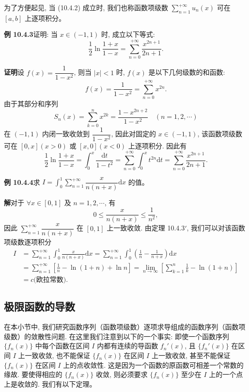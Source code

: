 \documentclass[UTF8,12pt,a4paper,fontset=fandol]{ctexart}
\begin{document}
为了方便起见, 当 (10.4.2) 成立时, 我们也称函数项级数 $\sum\limits_{n=1}^{+\infty}u_n(x)$ 可在 $[a,b]$ 上逐项积分。

\noindent\textbf{例 10.4.3}\quad 证明: 当 $x\in(-1,1)$ 时, 成立以下等式:
\[
  \frac12\ln\frac{1+x}{1-x}
  =\sum_{n=0}^{+\infty}\frac{x^{2n+1}}{2n+1}.
\]

\noindent\textbf{证明}\quad 设 $f(x)=\dfrac1{1-x^2}$, 则当 $|x|<1$ 时, $f(x)$ 是以下几何级数的和函数:
\[
  f(x)=\frac1{1-x^2}=\sum_{n=0}^{+\infty}x^{2n}.
\]
由于其部分和序列
\[
  S_n(x)=\sum_{k=0}^n x^{2k}=\frac{1-x^{2n+2}}{1-x^2}\quad(n=1,2,\cdots)
\]
在 $(-1,1)$ 内闭一致收敛到 $\dfrac1{1-x^2}$, 因此对固定的 $x\in(-1,1)$, 该函数项级数可在 $[0,x](x>0)$ 或 $[x,0](x<0)$ 上逐项积分. 因此有
\[
  \frac12\ln\frac{1+x}{1-x}
  =\int_0^x\frac{\mathrm dt}{1-t^2}
  =\sum_{n=0}^{+\infty}\int_0^x t^{2n}\mathrm dt
  =\sum_{n=0}^{+\infty}\frac{x^{2n+1}}{2n+1}.
\]

\noindent\textbf{例 10.4.4}\quad 求 $I=\int_0^1\sum\limits_{n=1}^{+\infty}\dfrac{x}{n(n+x)}\mathrm dx$ 的值。

\noindent\textbf{解}\quad 对于 $\forall x\in[0,1]$ 及 $n=1,2,\cdots$, 有
\[
  0\leq\frac{x}{n(n+x)}\leq\frac1{n^2},
\]
因此 $\sum\limits_{n=1}^{+\infty}\dfrac{x}{n(n+x)}$ 在 $[0,1]$ 上一致收敛. 由定理 10.4.3$'$, 我们可以对该函数项级数逐项积分
\[
\begin{aligned}
  I
  &=\sum_{n=1}^{+\infty}\int_0^1\frac{x}{n(n+x)}\mathrm dx
   =\sum_{n=1}^{+\infty}\int_0^1\left(\frac1n-\frac1{n+x}\right)\mathrm dx\\
  &=\sum_{n=1}^{+\infty}\left[\frac1n-\ln(1+n)+\ln n\right]
   =\lim_{n\to\infty}\left[\sum_{k=1}^n\frac1k-\ln(1+n)\right]\\
  &=c\text{(欧拉常数)}.
\end{aligned}
\]

\subsection{极限函数的导数}

在本小节中, 我们研究函数序列（函数项级数）逐项求导组成的函数序列（函数项级数）的敛散性问题. 在这里我们注意到以下的一个事实: 即使一个函数序列 $\{f_n(x)\}$ 中每个函数在区间 $I$ 内都有连续的导函数 $f_n'(x)$, 且 $\{f_n'(x)\}$ 在区间 $I$ 上一致收敛, 也不能保证 $\{f_n(x)\}$ 在区间 $I$ 上一致收敛, 甚至不能保证 $\{f_n(x)\}$ 在区间 $I$ 上的点收敛性. 这是因为一个函数的原函数可相差一个常数的缘故. 要使得相应的 $\{f_n(x)\}$ 收敛, 则必须要求 $\{f_n(x)\}$ 至少在 $I$ 上的一个点上是收敛的. 我们有以下定理。
\end{document}
